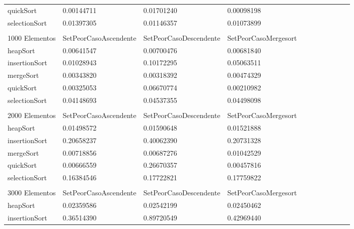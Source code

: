 \documentclass[article,a4paper]{article}
\begin{document}
\begin{table}[h]
\begin{adjustbox}{width=\textwidth,totalheight=\textheight,keepaspectratio}
\begin{tabular}{lllllllllll}
quickSort       & 0.00144711            & 0.01701240             & 0.00098198           \\
selectionSort   & 0.01397305            & 0.01146357             & 0.01073899           \\
                &                       &                        &                      \\
1000 Elementos  & SetPeorCasoAscendente & SetPeorCasoDescendente & SetPeorCasoMergesort \\
heapSort        & 0.00641547            & 0.00700476             & 0.00681840           \\
insertionSort   & 0.01028943            & 0.10172295             & 0.05063511           \\
mergeSort       & 0.00343820            & 0.00318392             & 0.00474329           \\
quickSort       & 0.00325053            & 0.06670774             & 0.00210982           \\
selectionSort   & 0.04148693            & 0.04537355             & 0.04498098           \\
                &                       &                        &                      \\
2000 Elementos  & SetPeorCasoAscendente & SetPeorCasoDescendente & SetPeorCasoMergesort \\
heapSort        & 0.01498572            & 0.01590648             & 0.01521888           \\
insertionSort   & 0.20658237            & 0.40062390             & 0.20731328           \\
mergeSort       & 0.00718856            & 0.00687276             & 0.01042529           \\
quickSort       & 0.00666559            & 0.26670357             & 0.00457816           \\
selectionSort   & 0.16384546            & 0.17722821             & 0.17759822           \\
                &                       &                        &                      \\
3000 Elementos  & SetPeorCasoAscendente & SetPeorCasoDescendente & SetPeorCasoMergesort \\
heapSort        & 0.02359586            & 0.02542199             & 0.02450462           \\
insertionSort   & 0.36514390            & 0.89720549             & 0.42969440           \\

\end{tabular}
\end{adjustbox}
\end{table}
\end{document}
